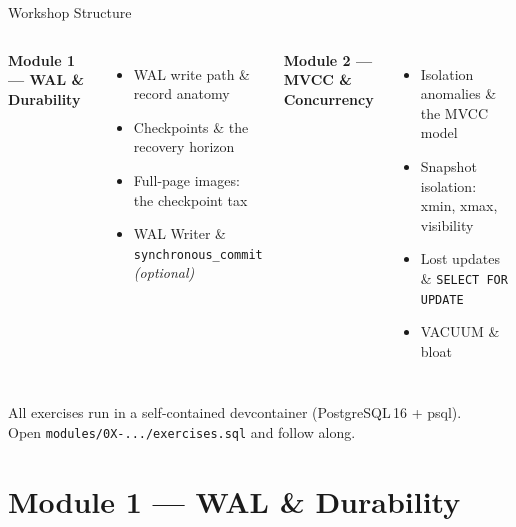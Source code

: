 \documentclass[aspectratio=169,10pt]{beamer}
\begin{document}
\begin{frame}{Workshop Structure}
  \begin{columns}[T]
    \textbf{\faServer\enspace Module 1 --- WAL \& Durability}
    \begin{itemize}\small
      \item WAL write path \& record anatomy
      \item Checkpoints \& the recovery horizon
      \item Full-page images: the checkpoint tax
      \item {\color{gray}WAL Writer \& \texttt{synchronous\_commit} \textit{(optional)}}
    \end{itemize}

    \textbf{\faDatabase\enspace Module 2 --- MVCC \& Concurrency}
    \begin{itemize}\small
      \item Isolation anomalies \& the MVCC model
      \item Snapshot isolation: xmin, xmax, visibility
      \item Lost updates \& \texttt{SELECT FOR UPDATE}
      \item VACUUM \& bloat
    \end{itemize}
  \end{columns}

  \vspace{0.7em}
  \begin{center}
    {\small\faTerminal\enspace
     All exercises run in a self-contained devcontainer (PostgreSQL\,16 + psql).\\
     Open \texttt{modules/0X-.../exercises.sql} and follow along.}
  \end{center}
\end{frame}

\section{Module 1 --- WAL \& Durability}
\end{document}

